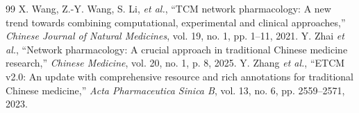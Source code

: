 \documentclass[journal,twoside,web]{ieeecolor}
\begin{document}
\begin{thebibliography}{99}
 X. Wang, Z.-Y. Wang, S. Li, \textit{et al.}, ``TCM network pharmacology: A new trend towards combining computational, experimental and clinical approaches,'' \textit{Chinese Journal of Natural Medicines}, vol. 19, no. 1, pp. 1--11, 2021.
 Y. Zhai \textit{et al.}, ``Network pharmacology: A crucial approach in traditional Chinese medicine research,'' \textit{Chinese Medicine}, vol. 20, no. 1, p. 8, 2025.
 Y. Zhang \textit{et al.}, ``ETCM v2.0: An update with comprehensive resource and rich annotations for traditional Chinese medicine,'' \textit{Acta Pharmaceutica Sinica B}, vol. 13, no. 6, pp. 2559--2571, 2023.

\end{thebibliography}
\end{document}
